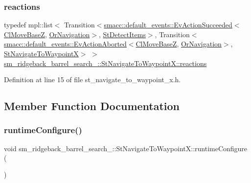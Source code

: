 \subsubsection{\texorpdfstring{reactions}{reactions}}
{\footnotesize\ttfamily typedef mpl\+::list$<$ Transition$<$\hyperlink{structsmacc_1_1default__events_1_1EvActionSucceeded}{smacc\+::default\+\_\+events\+::\+Ev\+Action\+Succeeded}$<$\hyperlink{classcl__move__base__z_1_1ClMoveBaseZ}{Cl\+Move\+BaseZ}, \hyperlink{classsm__ridgeback__barrel__search__1_1_1OrNavigation}{Or\+Navigation}$>$, \hyperlink{structsm__ridgeback__barrel__search__1_1_1StDetectItems}{St\+Detect\+Items}$>$, Transition$<$\hyperlink{structsmacc_1_1default__events_1_1EvActionAborted}{smacc\+::default\+\_\+events\+::\+Ev\+Action\+Aborted}$<$\hyperlink{classcl__move__base__z_1_1ClMoveBaseZ}{Cl\+Move\+BaseZ}, \hyperlink{classsm__ridgeback__barrel__search__1_1_1OrNavigation}{Or\+Navigation}$>$, \hyperlink{structsm__ridgeback__barrel__search__1_1_1StNavigateToWaypointX}{St\+Navigate\+To\+WaypointX}$>$ $>$ \hyperlink{structsm__ridgeback__barrel__search__1_1_1StNavigateToWaypointX_ab19dd0e98bcd2e808a4207413a66ddb5}{sm\+\_\+ridgeback\+\_\+barrel\+\_\+search\+\_\+::\+St\+Navigate\+To\+Waypoint\+X\+::reactions}}



Definition at line 15 of file st\+\_\+navigate\+\_\+to\+\_\+waypoint\+\_\+x.\+h.



\subsection{Member Function Documentation}
\mbox{\label{structsm__ridgeback__barrel__search__1_1_1StNavigateToWaypointX_a8619cadb86da6070f8d084f327563ca0}} 
\subsubsection{\texorpdfstring{runtime\+Configure()}{runtimeConfigure()}}
{\footnotesize\ttfamily void sm\+\_\+ridgeback\+\_\+barrel\+\_\+search\+\_\+::\+St\+Navigate\+To\+Waypoint\+X\+::runtime\+Configure (\begin{DoxyParamCaption}{ }\end{DoxyParamCaption})\hspace{0.3cm}{\ttfamily [inline]}}



